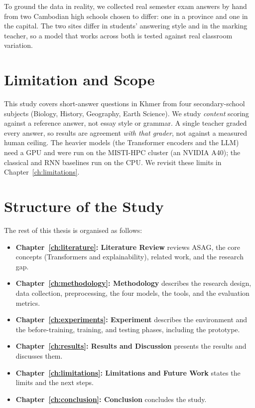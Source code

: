 To ground the data in reality, we collected real semester exam answers by hand from two Cambodian high
schools chosen to differ: one in a province and one in the capital. The two sites differ in students'
answering style and in the marking teacher, so a model that works across both is tested against real
classroom variation.

\section{Limitation and Scope}
This study covers short-answer questions in Khmer from four secondary-school subjects (Biology,
History, Geography, Earth Science). We study \emph{content} scoring against a reference answer, not
essay style or grammar. A single teacher graded every answer, so results are agreement \emph{with that
grader}, not against a measured human ceiling. The heavier models (the Transformer encoders and the
LLM) need a GPU and were run on the MISTI-HPC cluster (an NVIDIA A40); the classical and RNN baselines run on the CPU. We
revisit these limits in Chapter~\ref{ch:limitations}.

\section{Structure of the Study}
The rest of this thesis is organised as follows:

\begin{itemize}[leftmargin=1.4em]
  \item \textbf{Chapter~\ref{ch:literature}: Literature Review} reviews ASAG, the core concepts
  (Transformers and explainability), related work, and the research gap.
  \item \textbf{Chapter~\ref{ch:methodology}: Methodology} describes the research design, data
  collection, preprocessing, the four models, the tools, and the evaluation metrics.
  \item \textbf{Chapter~\ref{ch:experiments}: Experiment} describes the environment and the
  before-training, training, and testing phases, including the prototype.
  \item \textbf{Chapter~\ref{ch:results}: Results and Discussion} presents the results and discusses
  them.
  \item \textbf{Chapter~\ref{ch:limitations}: Limitations and Future Work} states the limits and the
  next steps.
  \item \textbf{Chapter~\ref{ch:conclusion}: Conclusion} concludes the study.
\end{itemize}
